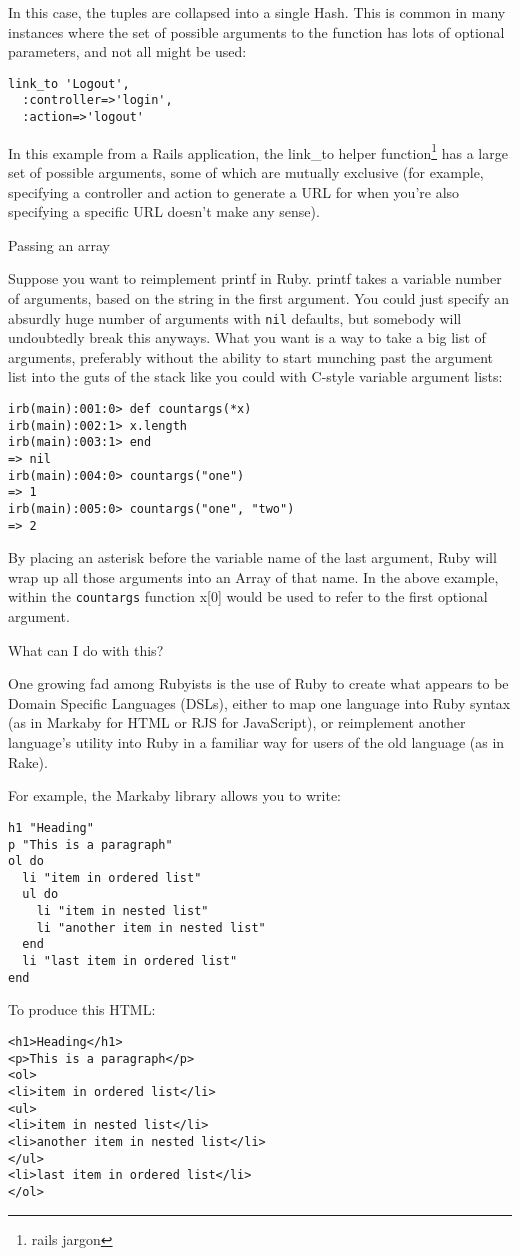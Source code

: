 \documentclass{slides}
\newcommand{\sh}[1]{
	{\Large #1}
	
}
\newcommand{\subh}[1]{
	{\large #1}
	
}
\begin{document}
\begin{slide}
In this case, the tuples are collapsed into a single Hash.  This is common in many instances where the set of possible arguments to the function has lots of optional parameters, and not all might be used:
\begin{verbatim}
link_to 'Logout',
  :controller=>'login',
  :action=>'logout'
\end{verbatim}
In this example from a Rails application, the link\_to helper function\footnote{rails jargon} has a large set of possible arguments, some of which are mutually exclusive (for example, specifying a controller and action to generate a URL for when you're also specifying a specific URL doesn't make any sense).
\end{slide}
\begin{slide}
\subh{Passing an array} 
Suppose you want to reimplement printf in Ruby.  printf takes a variable number of arguments, based on the string in the first argument.  You could just specify an absurdly huge number of arguments with \verb|nil| defaults, but somebody will undoubtedly break this anyways.  What you want is a way to take a big list of arguments, preferably without the ability to start munching past the argument list into the guts of the stack like you could with C-style variable argument lists:
\begin{verbatim}
irb(main):001:0> def countargs(*x)
irb(main):002:1> x.length
irb(main):003:1> end
=> nil
irb(main):004:0> countargs("one")
=> 1
irb(main):005:0> countargs("one", "two")
=> 2
\end{verbatim}
By placing an asterisk before the variable name of the last argument, Ruby will wrap up all those arguments into an Array of that name.  In the above example, within the \verb|countargs| function x[0] would be used to refer to the first optional argument. 
\end{slide}

\begin{slide}
\sh{What can I do with this?}
One growing fad among Rubyists is the use of Ruby to create what appears to be Domain Specific Languages (DSLs), either to map one language into Ruby syntax (as in Markaby for HTML or RJS for JavaScript), or reimplement another language's utility into Ruby in a familiar way for users of the old language  (as in Rake).

For example, the Markaby library allows you to write:
\begin{verbatim}
h1 "Heading"
p "This is a paragraph"
ol do
  li "item in ordered list"
  ul do
    li "item in nested list"
    li "another item in nested list"
  end
  li "last item in ordered list"
end
\end{verbatim}
\end{slide}
\begin{slide}
To produce this HTML:
\begin{verbatim}
<h1>Heading</h1>
<p>This is a paragraph</p>
<ol>
<li>item in ordered list</li>
<ul>
<li>item in nested list</li>
<li>another item in nested list</li>
</ul>
<li>last item in ordered list</li>
</ol>
\end{verbatim}
\end{slide}
\end{document}
